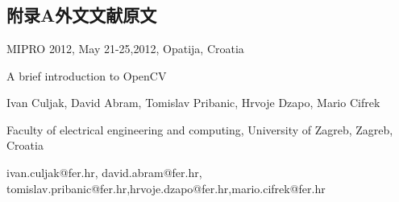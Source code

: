\documentclass{bjtu-bachelor-thesis}
\begin{document}

\printbibliography[heading=myheading]
\cleardoublepage
\thankspage
{}
\appendix

\chapter*{}

\section*{附录A\hspace{1em}外文文献原文}
\noindent MIPRO 2012, May 21-25,2012, Opatija, Croatia \par

\begin{center}
    A brief introduction to OpenCV\par
    Ivan Culjak, David Abram, Tomislav Pribanic, Hrvoje Dzapo, Mario Cifrek\par
    Faculty of electrical engineering and computing, University of Zagreb, Zagreb, Croatia\par
    ivan.culjak@fer.hr, david.abram@fer.hr, tomislav.pribanic@fer.hr,hrvoje.dzapo@fer.hr,mario.cifrek@fer.hr
\end{center}
\end{document}
